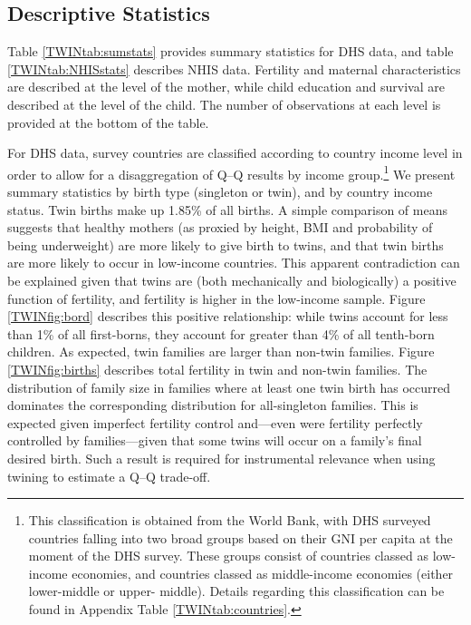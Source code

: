 \documentclass[subeqn]{article}
\begin{document}
\begin{spacing}{1.4}
\subsection{Descriptive Statistics}                \label{TWINsscn:descriptives}
Table \ref{TWINtab:sumstats} provides summary statistics for DHS data, and table
\ref{TWINtab:NHISstats} describes NHIS data.  Fertility and maternal 
characteristics are described at the level of the mother, while child education 
and survival are described at the level of the child. The number of observations 
at each level is provided at the bottom of the table.

For DHS data, survey countries are classified according to country income level 
in order to allow for a disaggregation of Q--Q results by income group.\footnote{
This classification is obtained from the World Bank, with DHS surveyed countries 
falling into two broad groups based on their GNI per capita at the moment of the 
DHS survey. These groups consist of countries classed as low-income economies, 
and countries classed as middle-income economies (either lower-middle or upper-%
middle). Details regarding this classification can be found in Appendix Table 
\ref{TWINtab:countries}.} We present summary statistics by birth type (singleton 
or twin), and by country income status. Twin births make up 1.85\% of all births.
A simple comparison of means suggests that healthy mothers (as proxied by height, 
BMI and probability of being underweight) are more likely to give birth to twins, 
and that twin births are more likely to occur in low-income countries. This 
apparent contradiction can be explained given that twins are (both mechanically 
and biologically) a positive function of fertility, and fertility is higher in 
the low-income sample. Figure \ref{TWINfig:bord} describes this positive 
relationship: while twins account for less than 1\% of all first-borns, they 
account for greater than 4\% of all tenth-born children. As expected, twin 
families are larger than non-twin families. Figure \ref{TWINfig:births} 
describes total fertility in twin and non-twin families. The distribution of 
family size in families where at least one twin birth has occurred dominates the 
corresponding distribution for all-singleton families.  This is expected given 
imperfect fertility control and---even were fertility perfectly controlled by 
families---given that some twins will occur on a family's final desired birth. 
Such a result is required for instrumental relevance when using twining to 
estimate a Q--Q trade-off.


\end{spacing}
\end{document}
